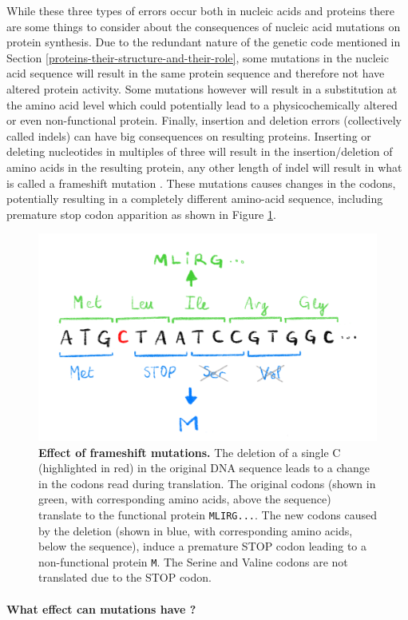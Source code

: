 \documentclass[
  11pt,
  twoside,
  BCOR=10mm,
  listof=totoc]{scrbook}
\newcommand{\extcaption}[2]{
    \caption[#1]{
        \textbf{#1}\newline
        #2
    }
}
\begin{document}
While these three types of errors occur both in nucleic acids and proteins there are some things to consider about the consequences of nucleic acid mutations on protein synthesis. Due to the redundant nature of the genetic code mentioned in Section \ref{proteins-their-structure-and-their-role}, some mutations in the nucleic acid sequence will result in the same protein sequence and therefore not have altered protein activity. Some mutations however will result in a substitution at the amino acid level which could potentially lead to a physicochemically altered or even non-functional protein. Finally, insertion and deletion errors (collectively called indels) can have big consequences on resulting proteins. Inserting or deleting nucleotides in multiples of three will result in the insertion/deletion of amino acids in the resulting protein, any other length of indel will result in what is called a frameshift mutation \autocite{rothFrameshiftMutations1974}. These mutations causes changes in the codons, potentially resulting in a completely different amino-acid sequence, including premature stop codon apparition as shown in Figure \ref{fig:frameshift}.

\begin{figure}[h]
\centering
\includegraphics[width=0.5\linewidth]{./figures/Sequence-Intro/Frameshift.png}
\extcaption{Effect of frameshift mutations.}{The deletion of a single C (highlighted in red) in the original DNA sequence leads to a change in the codons read during translation. The original codons (shown in green, with corresponding amino acids, above the sequence) translate to the functional protein \texttt{MLIRG...}. The new codons caused by the deletion (shown in blue, with corresponding amino acids, below the sequence), induce a premature STOP codon leading to a non-functional protein \texttt{M}. The Serine and Valine codons are not translated due to the STOP codon.}
\label{fig:frameshift}
\end{figure}

\hypertarget{what-effect-can-mutations-have}{%
\paragraph{What effect can mutations have ?}\label{what-effect-can-mutations-have}}
\end{document}
